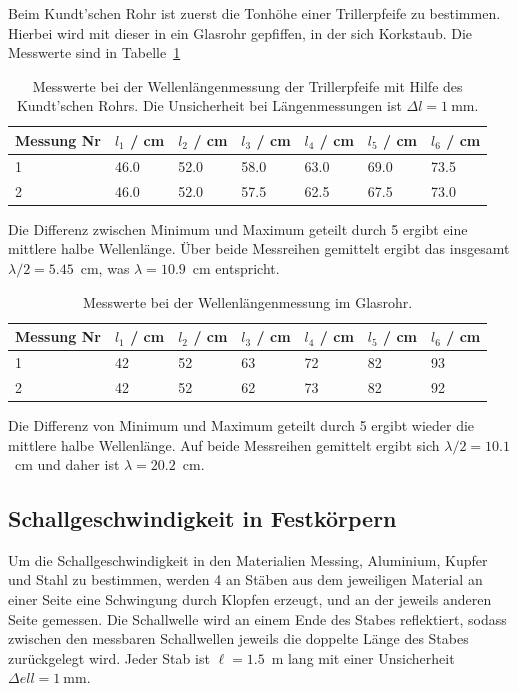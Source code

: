 \documentclass{article}
\begin{document}
Beim Kundt'schen Rohr ist zuerst die Tonhöhe einer Trillerpfeife zu bestimmen. Hierbei wird mit dieser in ein Glasrohr gepfiffen, in der sich Korkstaub. Die Messwerte sind in Tabelle~\ref{tab:rohr}

\begin{table}[H]
\caption{Messwerte bei der Wellenlängenmessung der Trillerpfeife mit Hilfe des Kundt'schen Rohrs. Die Unsicherheit bei Längenmessungen ist $\Delta l = 1~$mm.}
\label{tab:rohr}
\begin{tabular}{l|llllll}
Messung Nr &  $l_1$ / cm &  $l_2$ / cm &  $l_3$ / cm &  $l_4$ / cm &  $l_5$ / cm &   $l_6$ / cm \\
\hline
1 & 46.0 & 52.0 & 58.0 & 63.0 & 69.0 & 73.5 \\
2 & 46.0 & 52.0 & 57.5 & 62.5 & 67.5 & 73.0
\end{tabular}

\end{table} 
Die Differenz zwischen Minimum und Maximum geteilt durch 5 ergibt eine mittlere halbe Wellenlänge. Über beide Messreihen gemittelt ergibt das insgesamt $\lambda/2 = 5.45$~cm, was $\lambda = 10.9$~cm entspricht.




\begin{table}[H]
\caption{Messwerte bei der Wellenlängenmessung im Glasrohr.}
\begin{tabular}{l|llllll}
Messung Nr & $l_1$ / cm & $l_2$ / cm & $l_3$ / cm & $l_4$ / cm & $l_5$ / cm &  $l_6$ / cm \\
\hline
1 & 42 & 52 & 63 & 72 & 82 & 93 \\
2 & 42 & 52 & 62 & 73 & 82 & 92
\end{tabular}
\end{table} 

Die Differenz von Minimum und Maximum geteilt durch 5 ergibt wieder die mittlere halbe Wellenlänge. Auf beide Messreihen gemittelt ergibt sich $\lambda/2 = 10.1$~cm und daher ist $\lambda=20.2$~cm.



\subsection{Schallgeschwindigkeit in Festkörpern}

Um die Schallgeschwindigkeit in den Materialien Messing, Aluminium, Kupfer und Stahl zu bestimmen, werden 4 an Stäben aus dem jeweiligen Material an einer Seite eine Schwingung durch Klopfen erzeugt, und an der jeweils anderen Seite gemessen. Die Schallwelle wird an einem Ende des Stabes reflektiert, sodass zwischen den messbaren Schallwellen jeweils die doppelte Länge des Stabes zurückgelegt wird. Jeder Stab ist $\ell=1.5$~m lang mit einer Unsicherheit $\Delta ell = 1~$mm.
\end{document}
